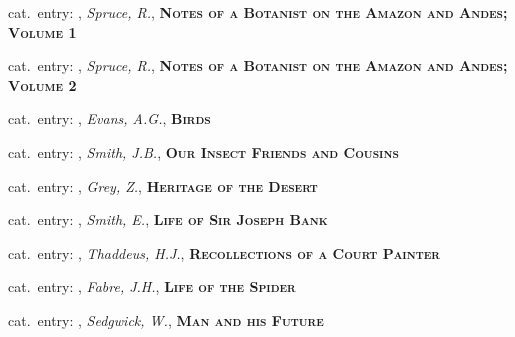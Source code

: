 \vbox{%
  \vspace*{0.5 cm}
  \noindent
  {\footnotesize{}\hspace{1em}cat.~entry: , \textit{Spruce, R.}, \textsc{\bfseries Notes of a Botanist on the Amazon and Andes; Volume 1}}
}

\vbox{%
  \vspace*{0.5 cm}
  \noindent
  {\footnotesize{}\hspace{1em}cat.~entry: , \textit{Spruce, R.}, \textsc{\bfseries Notes of a Botanist on the Amazon and Andes; Volume 2}}
}

\vbox{%
  \vspace*{0.5 cm}
  \noindent
  {\footnotesize{}\hspace{1em}cat.~entry: , \textit{Evans, A.G.}, \textsc{\bfseries Birds}}
}

\vbox{%
  \vspace*{0.5 cm}
  \noindent
  {\footnotesize{}\hspace{1em}cat.~entry: , \textit{Smith, J.B.}, \textsc{\bfseries Our Insect Friends and Cousins}}
}

\vbox{%
  \vspace*{0.5 cm}
  \noindent
  {\footnotesize{}\hspace{1em}cat.~entry: , \textit{Grey, Z.}, \textsc{\bfseries Heritage of the Desert}}
}

\vbox{%
  \vspace*{0.5 cm}
  \noindent
  {\footnotesize{}\hspace{1em}cat.~entry: , \textit{Smith, E.}, \textsc{\bfseries Life of Sir Joseph Bank}}
}

\vbox{%
  \vspace*{0.5 cm}
  \noindent
  {\footnotesize{}\hspace{1em}cat.~entry: , \textit{Thaddeus, H.J.}, \textsc{\bfseries Recollections of a Court Painter}}
}

\vbox{%
  \vspace*{0.5 cm}
  \noindent
  {\footnotesize{}\hspace{1em}cat.~entry: , \textit{Fabre, J.H.}, \textsc{\bfseries Life of the Spider}}
}

\vbox{%
  \vspace*{0.5 cm}
  \noindent
  {\footnotesize{}\hspace{1em}cat.~entry: , \textit{Sedgwick, W.}, \textsc{\bfseries Man and his Future}}
}

